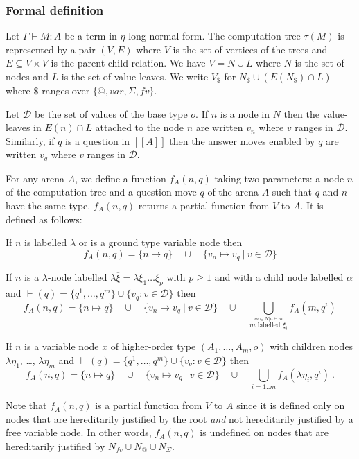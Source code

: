 \documentclass{llncs}
\newcommand{\lsem}{[\![} %
\newcommand{\rsem}{]\!]} %
\newcommand{\sem}[1]{{\lsem #1 \rsem}}
\newcommand\inter{\cap}
\newcommand\union{\cup}
\newcommand\Union{\bigcup}
\begin{document}
\subsubsection{Formal definition}

Let $\Gamma \vdash M : A$ be a term in $\eta$-long normal form. The computation tree $\tau(M)$
is represented by a pair $(V,E)$ where $V$ is the set of vertices of
the trees and $E \subseteq V \times V$ is the parent-child relation. We have $V = N \union L$ where $N$ is the set of nodes and $L$ is the set of value-leaves.
We write $V_\$$  for $N_\$ \union (E(N_\$) \inter L) $ where $\$$ ranges over $\{@, var, \Sigma, fv \}$.


Let $\mathcal{D}$ be the set of values of the base type $o$. If $n$
is a node in $N$ then the value-leaves in
$E(n) \inter L$ attached to the node $n$ are written $v_n$ where $v$ ranges in $\mathcal{D}$.
Similarly, if $q$ is a question in $\sem{A}$ then the answer moves
enabled by $q$ are written $v_q$ where $v$ ranges in $\mathcal{D}$.

\begin{definition}
\label{def:phi_procedure}
For any arena $A$, we define a function $f_A(n,q)$ taking two parameters:
a node $n$ of the computation tree and a question move $q$ of the arena $A$
such that $q$ and $n$ have the same type.
$f_A(n,q)$ returns a partial function from $V$ to $A$. It is defined as follows:

 If $n$ is labelled $\lambda$ or is a ground type variable node then
        $$f_A(n,q) = \{ n \mapsto q \} \quad \union \quad  \{ v_n \mapsto v_q \ | \ v \in \mathcal{D} \}$$

 If $n$ is a $\lambda$-node labelled $\lambda \overline{\xi} = \lambda \xi_1 \ldots \xi_p$ with $p\geq 1$ and with a child node
labelled $\alpha$ and $\vdash( q ) = \{ q^1, \ldots, q^m \} \union \{  v_q : v \in \mathcal{D} \} $ then
    $$
    f_A(n,q) =  \{ n \mapsto q \} \quad  \union \quad  \{ v_n \mapsto v_q \ | \ v \in \mathcal{D} \}
                      \quad \union \quad  \Union_{\stackrel{ m \in N | n \vdash m}{ m \mbox{ labelled } \xi_i}} f_A( m, q^i)
    $$

 If $n$ is a variable node $x$ of higher-order type $(A_1,\ldots,A_m,o)$
with children nodes $\lambda \overline{\eta}_1$, \ldots, $\lambda \overline{\eta}_m$ and
$\vdash( q ) = \{ q^1, \ldots, q^m \} \union \{  v_q : v \in \mathcal{D} \} $ then
    $$f_A(n,q) =
         \{ n \mapsto q \} \quad \union\quad \{ v_n \mapsto v_q \ | \ v \in \mathcal{D}   \} \quad\union\quad     \Union_{i=1..m} f_A( \lambda \overline{\eta}_i, q^i) \ .
    $$

Note that $f_A(n,q)$ is a partial function from $V$ to $A$ since it is defined only
on nodes that are hereditarily justified by the root \emph{and} not hereditarily justified by a free variable node.
In other words, $f_A(n,q)$ is undefined on nodes that are hereditarily justified by $N_{fv} \union N_@ \union N_\Sigma$.
\end{definition}
\end{document}
